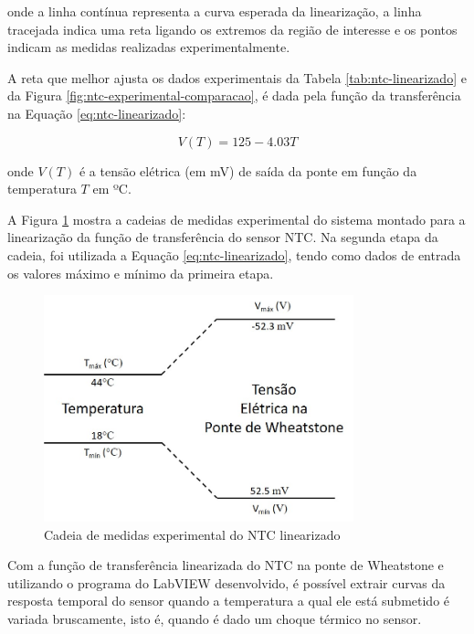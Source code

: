 \documentclass[a4paper]{instrumentacao}
\begin{document}
\noindent onde a linha contínua representa a curva esperada da linearização, a linha tracejada indica uma reta ligando os extremos da região de interesse e os pontos indicam as medidas realizadas experimentalmente.

A reta que melhor ajusta os dados experimentais da Tabela \ref{tab:ntc-linearizado} e da Figura \ref{fig:ntc-experimental-comparacao}, é dada pela função da transferência na Equação \ref{eq:ntc-linearizado}:


\begin{equation}
	V(T) = 125 - 4.03 T
	\label{eq:ntc-linearizado}
\end{equation}

\noindent onde $V(T)$ é a tensão elétrica (em mV) de saída da ponte em função da temperatura $T$ em ºC.

A Figura \ref{fig:ntc-cadeia-medidas-linearizado} mostra a cadeias de medidas experimental do sistema montado para a linearização da função de transferência do sensor NTC. Na segunda etapa da cadeia, foi utilizada a Equação \ref{eq:ntc-linearizado}, tendo como dados de entrada os valores máximo e mínimo da primeira etapa.

\begin{figure}[H]
\center
\includegraphics[width=0.8\textwidth]{cadeia_medidas_ntc_linearizado.jpg}
\caption{Cadeia de medidas experimental do NTC linearizado}
\label{fig:ntc-cadeia-medidas-linearizado}
\end{figure}

Com a função de transferência linearizada do NTC na ponte de Wheatstone e utilizando o programa do LabVIEW desenvolvido, é possível extrair curvas da resposta temporal do sensor quando a temperatura a qual ele está submetido é variada bruscamente, isto é, quando é dado um choque térmico no sensor.
\end{document}
